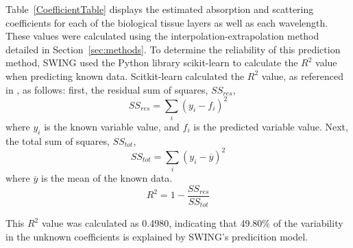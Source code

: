 \documentclass[journal,twoside,web]{ieeecolor}
\begin{document}
Table~\ref{CoefficientTable} displays the estimated absorption and scattering coefficients for each of the biological tissue 
layers as well as each wavelength. These values were calculated using the interpolation-extrapolation method detailed in 
Section~\ref{sec:methods}. To determine the reliability of this prediction method, SWING used the Python library scikit-learn\cite{b5} 
to calculate the $R^2$ value when predicting known data. Scitkit-learn calculated the $R^2$ value, as referenced in \cite{b5}, as follows:
first, the residual sum of squares, $SS_{res}$,
\begin{equation}
    SS_{res} = \sum_{i}{(y_i-f_i)^2}
\end{equation}
where $y_i$ is the known variable value, and $f_i$ is the predicted variable value.
Next, the total sum of squares, $SS_{tot}$,
\begin{equation}
    SS_{tot} = \sum_{i}{(y_i-\overline{y})^2}
\end{equation}
where $\overline{y}$ is the mean of the known data.
\begin{equation}
    R^2 = 1 - \frac{SS_{res}}{SS_{tot}}
\end{equation}

This $R^2$ value was calculated as 0.4980, indicating that 49.80\% of the variability in the unknown coefficients is 
explained by SWING's predicition model.
\end{document}

